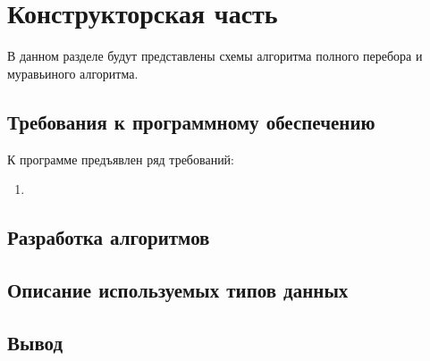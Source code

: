 \chapter{Конструкторская часть}

В данном разделе будут представлены схемы алгоритма полного перебора и муравьиного алгоритма.

\section{Требования к программному обеспечению}

К программе предъявлен ряд требований:
\begin{enumerate}
	\item 
\end{enumerate}

\section{Разработка алгоритмов}

\section{Описание используемых типов данных}

\section*{Вывод}
